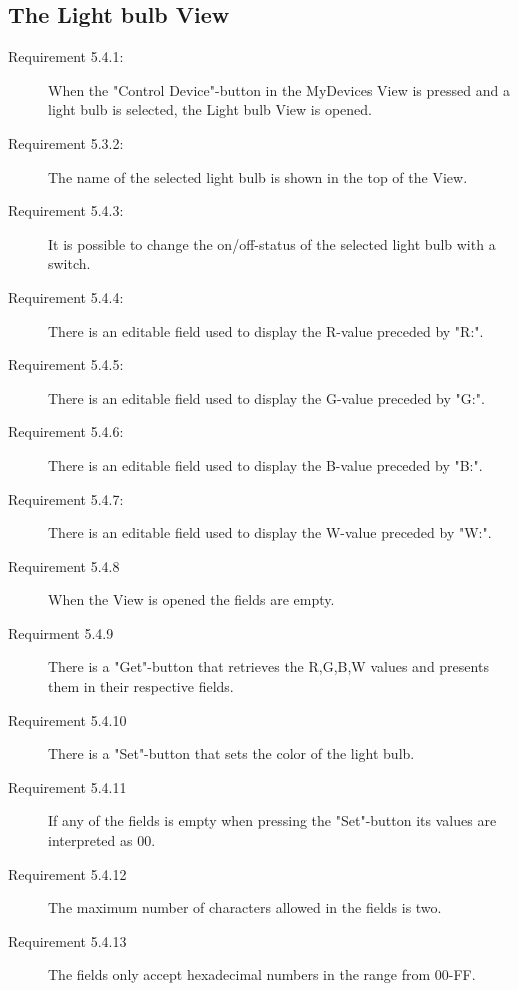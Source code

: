 \documentclass[a4paper]{article}
\begin{document}
\subsection{The Light bulb View}

\begin{description}
\item[Requirement 5.4.1:] When the "Control Device"-button in the MyDevices View is pressed and a light bulb is selected, the Light bulb View is opened.  

\item[Requirement 5.3.2:] The name of the selected light bulb is shown in the top of the View.

\item[Requirement 5.4.3:] It is possible to change the on/off-status of the selected light bulb with a switch.

\item[Requirement 5.4.4:] There is an editable field used to display the R-value preceded by "R:".

\item[Requirement 5.4.5:] There is an editable field used to display the G-value preceded by "G:".

\item[Requirement 5.4.6:] There is an editable field used to display the B-value preceded by "B:".

\item[Requirement 5.4.7:] There is an editable field used to display the W-value preceded by "W:".

\item[Requirement 5.4.8] When the View is opened the fields are empty.

\item[Requirment 5.4.9] There is a "Get"-button that retrieves the R,G,B,W values and presents them in their respective fields.

\item[Requirement 5.4.10] There is a "Set"-button that sets the color of the light bulb.

\item[Requirement 5.4.11] If any of the fields is empty when pressing the "Set"-button its values are interpreted as 00.

\item[Requirement 5.4.12] The maximum number of characters allowed in the fields is two.

\item[Requirement 5.4.13] The fields only accept hexadecimal numbers in the range from 00-FF.


\end{description}
\end{document}
